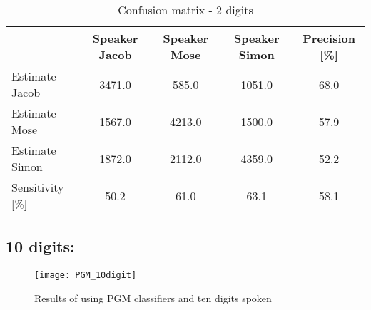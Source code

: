 \begin{table}[H]                                                    
\centering                                                          
\begin{tabular}{|l|c|c|c|c|}                                        
\hline                                                              
  & Speaker Jacob & Speaker Mose & Speaker Simon & Precision [\%] \\
\hline                                                              
Estimate Jacob & 3471.0 & 585.0 & 1051.0 & 68.0 \\                  
\hline                                                              
Estimate Mose & 1567.0 & 4213.0 & 1500.0 & 57.9 \\                  
\hline                                                              
Estimate Simon & 1872.0 & 2112.0 & 4359.0 & 52.2 \\                 
\hline                                                              
Sensitivity [\%] & 50.2 & 61.0 & 63.1 & 58.1 \\                     
\hline                                                              
\end{tabular}                                                       
\caption{Confusion matrix - 2 digits}                               
\label{table:PGM_conf_2}                                            
\end{table}   


\subsection{10 digits:}

\begin{figure}[H]
\centering
\texttt{[image: PGM\_10digit]}
\caption{Results of using PGM classifiers and ten digits spoken}
\label{fig:PGM_10dig}
\end{figure}


